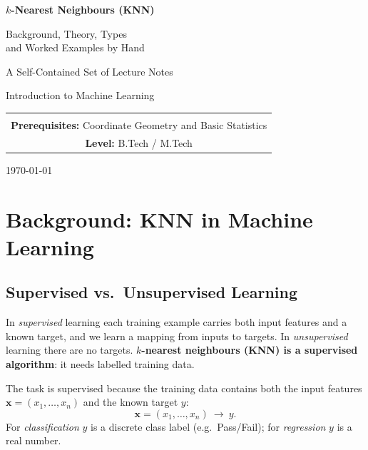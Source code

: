 \documentclass[11pt,a4paper]{report}
\theoremstyle{definition}
\theoremstyle{remark}
\newcommand{\vx}{\mathbf{x}}
\begin{document}
	
	\begin{titlepage}
		\centering
		\vspace*{2cm}
		{\Huge\bfseries $k$-Nearest Neighbours (KNN)\par}
		\vspace{0.6cm}
		{\Large Background, Theory, Types\\[2pt]
			and Worked Examples by Hand\par}
		\vspace{1.5cm}
		{\large A Self-Contained Set of Lecture Notes\par}
		\vspace{0.4cm}
		{\large Introduction to Machine Learning\par}
		\vspace{2.5cm}
		\begin{tabular}{c}
			\hline\\[-6pt]
			\textbf{Prerequisites:} Coordinate Geometry and Basic Statistics\\[4pt]
			\textbf{Level:} B.Tech / M.Tech\\[4pt]
			\hline
		\end{tabular}
		\vfill
		{\large \today\par}
	\end{titlepage}
	
	\tableofcontents
	\clearpage
	
	\chapter{Background: KNN in Machine Learning}
	
	\section{Supervised vs.\ Unsupervised Learning}
	In \emph{supervised} learning each training example carries both input features
	and a known target, and we learn a mapping from inputs to targets. In
	\emph{unsupervised} learning there are no targets. \textbf{$k$-nearest
		neighbours (KNN) is a supervised algorithm}: it needs labelled training data.
	
	\begin{conceptbox}
		The task is supervised because the training data contains both the input
		features $\vx=(x_1,\dots,x_n)$ and the known target $y$:
		\[
		\vx=(x_1,\dots,x_n)\ \longrightarrow\ y .
		\]
		For \emph{classification} $y$ is a discrete class label (e.g.\ Pass/Fail); for
		\emph{regression} $y$ is a real number.
	\end{conceptbox}
	
\end{document}
